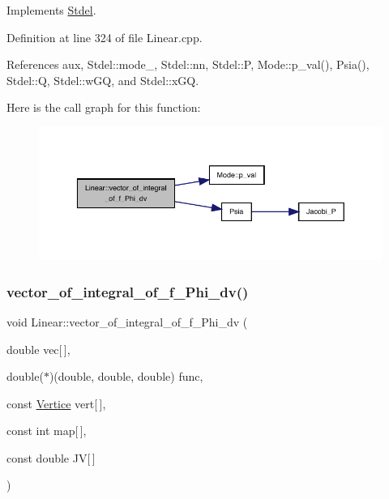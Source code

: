 Implements \hyperlink{classStdel_aa5ef347c02106753c2d3961b59a7309e}{Stdel}.



Definition at line 324 of file Linear.\+cpp.



References aux, Stdel\+::mode\+\_\+, Stdel\+::nn, Stdel\+::P, Mode\+::p\+\_\+val(), Psia(), Stdel\+::Q, Stdel\+::w\+GQ, and Stdel\+::x\+GQ.

Here is the call graph for this function\+:
\nopagebreak
\begin{figure}[H]
\begin{center}
\leavevmode
\includegraphics[width=350pt]{classLinear_a5068b12a277108b085b000b4ace97d45_cgraph}
\end{center}
\end{figure}
\mbox{\label{classLinear_a4ddfe0022d153dc9df417b84b6f7013d}} 
\subsubsection{\texorpdfstring{vector\+\_\+of\+\_\+integral\+\_\+of\+\_\+f\+\_\+\+Phi\+\_\+dv()}{vector\_of\_integral\_of\_f\_Phi\_dv()}\hspace{0.1cm}{\footnotesize\ttfamily [2/2]}}
{\footnotesize\ttfamily void Linear\+::vector\+\_\+of\+\_\+integral\+\_\+of\+\_\+f\+\_\+\+Phi\+\_\+dv (\begin{DoxyParamCaption}\item[{double}]{vec\mbox{[}$\,$\mbox{]},  }\item[{double($\ast$)(double, double, double)}]{func,  }\item[{const \hyperlink{structVertice}{Vertice}}]{vert\mbox{[}$\,$\mbox{]},  }\item[{const int}]{map\mbox{[}$\,$\mbox{]},  }\item[{const double}]{JV\mbox{[}$\,$\mbox{]} }\end{DoxyParamCaption})\hspace{0.3cm}{\ttfamily [virtual]}}



